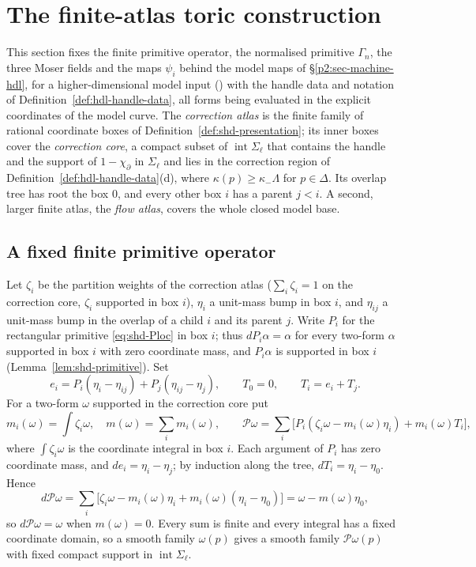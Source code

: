 \section{The finite-atlas toric construction}\label{sec:native-toric}

This section fixes the finite primitive operator, the normalised primitive $\Gamma_n$, the three Moser fields and the maps $\psi_i$
behind the model maps of \S\ref{p2:sec-machine-hdl}, for a higher-dimensional model input () with
the handle data and notation of Definition~\ref{def:hdl-handle-data}, all forms being evaluated in the explicit coordinates of the
model curve. The \emph{correction atlas} is the finite family of rational coordinate boxes of Definition~\ref{def:shd-presentation};
its inner boxes cover the \emph{correction core}, a compact subset of $\operatorname{int}\Sigma_\ell$ that contains the handle and
the support of $1-\chi_\partial$ in $\Sigma_\ell$ and lies in the correction region of Definition~\ref{def:hdl-handle-data}(d),
where $\kappa(p)\ge\kappa_-\Lambda$ for $p\in\Delta$. Its overlap tree has root the box $0$, and every other box $i$ has a parent
$j<i$. A second, larger finite atlas, the \emph{flow atlas}, covers the whole closed model base.

\subsection{A fixed finite primitive operator}

Let $\zeta_i$ be the partition weights of the correction atlas ($\sum_i\zeta_i=1$ on the correction core, $\zeta_i$ supported in box
$i$), $\eta_i$ a unit-mass bump in box $i$, and $\eta_{ij}$ a unit-mass bump in the overlap of a child $i$ and its parent $j$. Write
$P_i$ for the rectangular primitive \eqref{eq:shd-Ploc} in box $i$; thus $dP_i\alpha=\alpha$ for every two-form $\alpha$ supported
in box $i$ with zero coordinate mass, and $P_i\alpha$ is supported in box $i$ (Lemma~\ref{lem:shd-primitive}). Set
\[
 e_i=P_i(\eta_i-\eta_{ij})+P_j(\eta_{ij}-\eta_j),\qquad
 T_0=0,\qquad T_i=e_i+T_j .
\]
For a two-form $\omega$ supported in the correction core put
\[
 m_i(\omega)=\int\zeta_i\omega,\quad m(\omega)=\sum_i m_i(\omega),\qquad
 \mathcal P\omega=\sum_i\bigl[P_i(\zeta_i\omega-m_i(\omega)\eta_i)+m_i(\omega)T_i\bigr],
\]
where $\int\zeta_i\omega$ is the coordinate integral in box $i$. Each argument of $P_i$ has zero coordinate mass, and
$de_i=\eta_i-\eta_j$; by induction along the tree, $dT_i=\eta_i-\eta_0$. Hence
\[
 d\mathcal P\omega=\sum_i\bigl[\zeta_i\omega-m_i(\omega)\eta_i+m_i(\omega)(\eta_i-\eta_0)\bigr]=\omega-m(\omega)\eta_0 ,
\]
so $d\mathcal P\omega=\omega$ when $m(\omega)=0$. Every sum is finite and every integral has a fixed coordinate domain, so a smooth
family $\omega(p)$ gives a smooth family $\mathcal P\omega(p)$ with fixed compact support in $\operatorname{int}\Sigma_\ell$.


